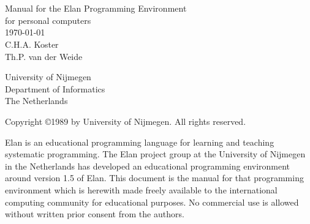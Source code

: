 
\def\dummylogo{
  \framebox
    {\tt\Huge\bf\raisebox{-0.5em}{\rule{0em}{1em}\rule{1em}{0em}}}
  \parbox[l]
    {10cm}
    {\small
      University of Nijmegen\\
      Department of Informatics\\
      The Netherlands}
  }

\begin{titlepage}
  \oddsidemargin  0.5in
  \evensidemargin 0.5in
  \textwidth      5.0in
  \begin{center}
      ~\\
      \vspace{3cm}
    {}\\
      \vspace{2cm}
    {Manual for the Elan Programming Environment}\\
    {for personal computers}\\
      \vspace{2cm}
    {\today}\\
      \vspace{2cm}
    {C.H.A. Koster}\\
    {Th.P. van der Weide}\\
      \vspace{2cm}
  \end{center}
  \vspace{6cm}
  \dummylogo

\newpage
\thispagestyle{empty}

\noindent
Copyright \copyright 1989 by University of Nijmegen.
All rights reserved.
\vspace{0.5in}

\noindent
Elan is an educational programming language for learning and
teaching systematic programming.
The Elan project group at the University of Nijmegen in
the Netherlands has developed an educational programming
environment around version 1.5 of Elan.
This document is the manual for that programming environment
which is herewith made freely available to the international
computing community for educational purposes.
No commercial use is allowed without written prior consent
from the authors.

\end{titlepage}
